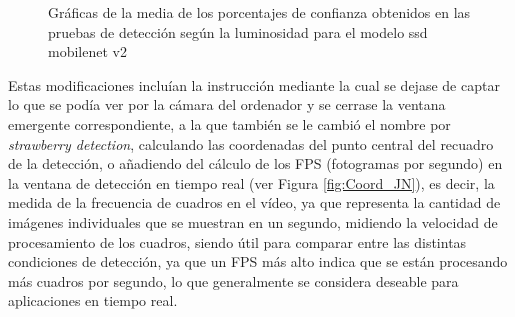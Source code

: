   \begin{figure}[H]
    \begin{center}
      \subcapcentertrue
      \hspace{4mm}
    \end{center}
    \caption{Gráficas de la media de los porcentajes de confianza obtenidos en las pruebas de detección según la luminosidad para el modelo ssd mobilenet v2}
    \label{fig:Grafica_medias_luminosidad}
  \end{figure}


Estas modificaciones incluían la instrucción mediante la cual se dejase de captar lo que se podía ver por la cámara del ordenador y se cerrase la ventana emergente correspondiente, a la que también se le cambió el nombre por \textit{strawberry detection}, calculando las coordenadas del punto central del recuadro de la detección, o añadiendo del cálculo de los FPS (fotogramas por segundo) en la ventana de detección en tiempo real (ver Figura \ref{fig:Coord_JN}), es decir, la medida de la frecuencia de cuadros en el vídeo, ya que representa la cantidad de imágenes individuales que se muestran en un segundo, midiendo la velocidad de procesamiento de los cuadros, siendo útil para comparar entre las distintas condiciones de detección, ya que un FPS más alto indica que se están procesando más cuadros por segundo, lo que generalmente se considera deseable para aplicaciones en tiempo real.\\ 


